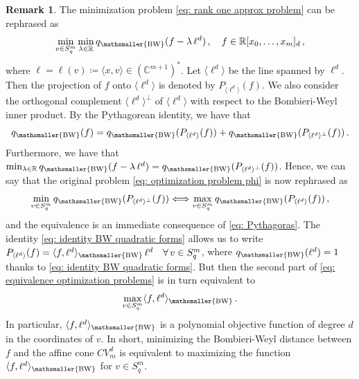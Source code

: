 \documentclass[11pt,reqno]{amsart}
\numberwithin{equation}{section}
\theoremstyle{plain}
\numberwithin{theorem}{section}
\theoremstyle{definition}
\newtheorem{remark}[theorem]{Remark}
\newcommand{\R}{\mathbb{R}}
\newcommand{\C}{\mathbb{C}}
\newcommand{\mBW}{\mathsmaller{\mathrm{BW}}}
\begin{document}
\begin{remark}\label{rmk: equivalence optimization problems}
The minimization problem \eqref{eq: rank one approx problem} can be rephrased as
\begin{equation}\label{eq: optimization problem phi}
    \min_{v\in S_q^m}\min_{\lambda\in\R}q_\mBW(f-\lambda\,\ell^d)\,,\quad f\in \R[x_0,\dots,x_m]_d\,,
\end{equation}
where $\ell=\ell(v)\coloneqq\langle x,v\rangle\in(\C^{m+1})^*$.
Let $\langle \ell^d\rangle$ be the line spanned by $\ell^d$. Then the projection of $f$ onto $\langle \ell^d\rangle$ is denoted by $P_{\langle \ell^d\rangle}(f)$. We also consider the orthogonal complement $\langle \ell^d\rangle^\perp$ of $\langle \ell^d\rangle$ with respect to the Bombieri-Weyl inner product. By the Pythagorean identity, we have that
\begin{equation}\label{eq: Pythagoras}
q_\mBW(f)=q_\mBW(P_{\langle \ell^d\rangle}(f))+q_\mBW(P_{\langle \ell^d\rangle^\perp}(f))\,.
\end{equation}
Furthermore, we have that $\min_{\lambda\in\R}q_\mBW(f-\lambda\,\ell^d) = q_\mBW(P_{\langle \ell^d\rangle^\perp}(f))$.
Hence, we can say that the original problem \eqref{eq: optimization problem phi} is now rephrased as
\begin{equation}\label{eq: equivalence optimization problems}
    \min_{v\in S_q^m}q_\mBW(P_{\langle \ell^d\rangle^\perp}(f)) \Longleftrightarrow \max_{v\in S_q^m}q_\mBW(P_{\langle \ell^d\rangle}(f))\,,
\end{equation}
and the equivalence is an immediate consequence of \eqref{eq: Pythagoras}.
The identity \eqref{eq: identity BW quadratic forms} allows us to write $P_{\langle \ell^d\rangle}(f) = \langle f, \ell^d\rangle_\mBW\, \ell^d\quad\forall\,v\in S_q^m$, where $q_\mBW(\ell^d)=1$ thanks to \eqref{eq: identity BW quadratic forms}. But then the second part of \eqref{eq: equivalence optimization problems} is in turn equivalent to
\begin{equation}\label{eq: simplified problem}
    \max_{v\in S_q^m}\langle f, \ell^d\rangle_\mBW\,.
\end{equation}
In particular, $\langle f, \ell^d\rangle_\mBW$ is a polynomial objective function of degree $d$ in the coordinates of $v$. In short, minimizing the Bombieri-Weyl distance between $f$ and the affine cone $CV_m^d$ is equivalent to maximizing the function $\langle f, \ell^d\rangle_\mBW$ for $v\in S_q^m$.
\end{remark}
\end{document}
